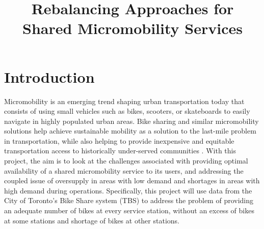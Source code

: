 \documentclass[conference]{IEEEtran}
\begin{document}
\title{Rebalancing Approaches for Shared Micromobility Services}

\author{
\and
{}
}

\maketitle


\section{Introduction}
Micromobility is an emerging trend shaping urban transportation today that consists of using small vehicles such as bikes, scooters, or skateboards to easily navigate in highly populated urban areas. Bike sharing and similar micromobility solutions help achieve sustainable mobility as a solution to the last-mile problem in transportation, while also helping to provide inexpensive and equitable transportation access to historically under-served communities \cite{khamis}. With this project, the aim is to look at the challenges associated with providing optimal availability of a shared micromobility service to its users, and addressing the coupled issue of oversupply in areas with low demand and shortages in areas with high demand during operations. Specifically, this project will use data from the City of Toronto's Bike Share system (TBS) to address the problem of providing an adequate number of bikes at every service station, without an excess of bikes at some stations and shortage of bikes at other stations.
\end{document}
